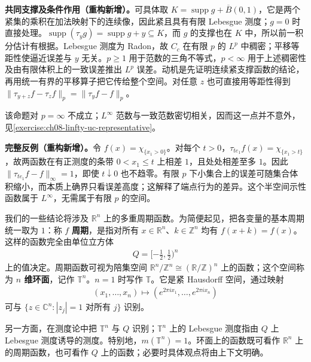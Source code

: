 \documentclass[../../main.tex]{subfiles}
\begin{document}
\begin{remark}
\textbf{共同支撑及条件作用（重构新增）。}可具体取 $K=\operatorname{supp} g+\overline B(0,1)$，它是两个紧集的乘积在加法映射下的连续像，因此紧且具有有限 Lebesgue 测度；$g=0$ 时直接处理。$\operatorname{supp}(\tau_yg)=\operatorname{supp} g+y\subseteq K$，而 $g$ 的支撑也在 $K$ 中，所以前一积分估计有根据。Lebesgue 测度为 Radon，故 $C_c$ 在有限 $p$ 的 $L^p$ 中稠密；平移等距性使逼近误差与 $y$ 无关。$p\geqslant1$ 用于范数的三角不等式，$p<\infty$ 用于上述稠密性及由有限体积上的一致误差推出 $L^p$ 误差。动机是先证明连续紧支撑函数的结论，再用统一有界的平移算子把它传给整个空间。对任意 $z$ 也可直接用等距性得到 $\|\tau_{y+z}f-\tau_zf\|_p=\|\tau_yf-f\|_p$。
\end{remark}
该命题对 $p=\infty$ 不成立；$L^\infty$ 范数与一致范数密切相关，因而这一点并不意外，见\cref{exercise:ch08-linfty-uc-representative}。
\begin{remark}
\textbf{完整反例（重构新增）。}令 $f(x)=\chi_{\{x_1>0\}}$。对每个 $t>0$，$\tau_{te_1}f(x)=\chi_{\{x_1>t\}}$，故两函数在有正测度的条带 $0<x_1\leqslant t$ 上相差 $1$，且处处相差至多 $1$。因此 $\|\tau_{te_1}f-f\|_\infty=1$，即使 $t\downarrow0$ 也不趋零。有限 $p$ 下小集合上的误差可随集合体积缩小，而本质上确界只看误差高度；这解释了端点行为的差异。这个半空间示性函数属于 $L^\infty$，无需属于有限 $p$ 的空间。
\end{remark}
\begin{definition}[周期函数与环面]\label{definition:ch08-torus}
我们的一些结论将涉及 $\mathbb R^n$ 上的多重周期函数。为简便起见，把各变量的基本周期统一取为 $1$：称 $f$ \textbf{周期}，是指对所有 $x\in\mathbb R^n$、$k\in\mathbb Z^n$ 均有 $f(x+k)=f(x)$。这样的函数完全由单位立方体
\begin{align*}
Q=[-\tfrac12,\tfrac12)^n
\end{align*}
上的值决定。周期函数可视为陪集空间 $\mathbb R^n/\mathbb Z^n\cong(\mathbb R/\mathbb Z)^n$ 上的函数；这个空间称为 \textbf{$n$ 维环面}，记作 $\mathbb T^n$。$n=1$ 时写作 $\mathbb T$。它是紧 Hausdorff 空间，通过映射
\begin{align*}
(x_1,\ldots,x_n)\longmapsto(e^{2\pi ix_1},\ldots,e^{2\pi ix_n})
\end{align*}
可与 $\{z\in\mathbb C^n:|z_j|=1\text{ 对所有 }j\}$ 识别。

另一方面，在测度论中把 $\mathbb T^n$ 与 $Q$ 识别；$\mathbb T^n$ 上的 Lebesgue 测度指由 $Q$ 上 Lebesgue 测度诱导的测度。特别地，$m(\mathbb T^n)=1$。环面上的函数既可看作 $\mathbb R^n$ 上的周期函数，也可看作 $Q$ 上的函数；必要时具体观点将由上下文明确。
\end{definition}
\end{document}
